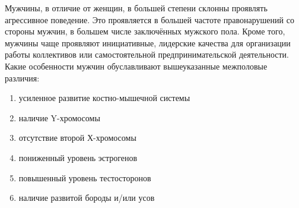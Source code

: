 
Мужчины, в отличие от женщин, в большей степени склонны проявлять агрессивное поведение. Это проявляется в большей частоте правонарушений со стороны мужчин, в большем числе заключённых мужского пола. Кроме того, мужчины чаще проявляют инициативные, лидерские качества для организации работы коллективов или самостоятельной предпринимательской деятельности. Какие особенности мужчин обуславливают вышеуказанные межполовые различия:

\begin{enumerate}
    \item усиленное развитие костно-мышечной системы
    \item наличие Y-хромосомы
    \item отсутствие второй Х-хромосомы
    \item пониженный уровень эстрогенов
    \item повышенный уровень тестосторонов
    \item наличие развитой бороды и/или усов
\end{enumerate}